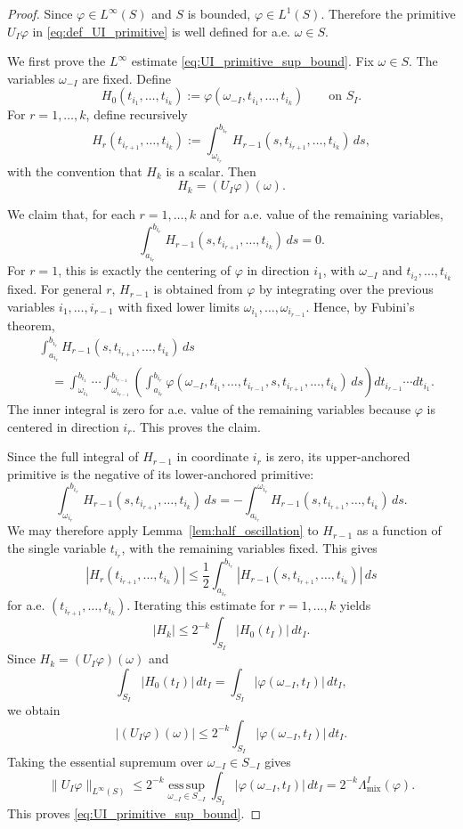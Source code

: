 \documentclass[11pt,letterpaper]{article}
\theoremstyle{definition}
\theoremstyle{remark}
\begin{document}
\begin{proof}
Since $\varphi\in L^\infty(S)$ and $S$ is bounded, $\varphi\in L^1(S)$.
Therefore the primitive $U_I\varphi$ in \eqref{eq:def_UI_primitive} is well
defined for a.e. $\omega\in S$.

We first prove the $L^\infty$ estimate
\eqref{eq:UI_primitive_sup_bound}. Fix $\omega\in S$. The variables
$\omega_{-I}$ are fixed. Define
$$
H_0(t_{i_1},\ldots,t_{i_k})
:=
\varphi(\omega_{-I},t_{i_1},\ldots,t_{i_k})
\qquad\text{on }S_I.
$$
For $r=1,\ldots,k$, define recursively
$$
H_r(t_{i_{r+1}},\ldots,t_{i_k})
:=
\int_{\omega_{i_r}}^{b_{i_r}}
H_{r-1}(s,t_{i_{r+1}},\ldots,t_{i_k})\,ds,
$$
with the convention that $H_k$ is a scalar. Then
$$
H_k=(U_I\varphi)(\omega).
$$

We claim that, for each $r=1,\ldots,k$ and for a.e. value of the remaining
variables,
$$
\int_{a_{i_r}}^{b_{i_r}}
H_{r-1}(s,t_{i_{r+1}},\ldots,t_{i_k})\,ds=0.
$$
For $r=1$, this is exactly the centering of $\varphi$ in direction $i_1$, with
$\omega_{-I}$ and $t_{i_2},\ldots,t_{i_k}$ fixed. For general $r$,
$H_{r-1}$ is obtained from $\varphi$ by integrating over the previous
variables $i_1,\ldots,i_{r-1}$ with fixed lower limits
$\omega_{i_1},\ldots,\omega_{i_{r-1}}$. Hence, by Fubini's theorem,
$$
\begin{aligned}
&\int_{a_{i_r}}^{b_{i_r}}
H_{r-1}(s,t_{i_{r+1}},\ldots,t_{i_k})\,ds
\\
&\quad =
\int_{\omega_{i_1}}^{b_{i_1}}
\cdots
\int_{\omega_{i_{r-1}}}^{b_{i_{r-1}}}
\left(
\int_{a_{i_r}}^{b_{i_r}}
\varphi(\omega_{-I},t_{i_1},\ldots,t_{i_{r-1}},s,
t_{i_{r+1}},\ldots,t_{i_k})\,ds
\right)
dt_{i_{r-1}}\cdots dt_{i_1}.
\end{aligned}
$$
The inner integral is zero for a.e. value of the remaining variables because
$\varphi$ is centered in direction $i_r$. This proves the claim.

Since the full integral of $H_{r-1}$ in coordinate $i_r$ is zero, its
upper-anchored primitive is the negative of its lower-anchored primitive:
$$
\int_{\omega_{i_r}}^{b_{i_r}}
H_{r-1}(s,t_{i_{r+1}},\ldots,t_{i_k})\,ds
=
-
\int_{a_{i_r}}^{\omega_{i_r}}
H_{r-1}(s,t_{i_{r+1}},\ldots,t_{i_k})\,ds.
$$
We may therefore apply Lemma~\ref{lem:half_oscillation} to
$H_{r-1}$ as a function of the single variable $t_{i_r}$, with the remaining
variables fixed. This gives
$$
|H_r(t_{i_{r+1}},\ldots,t_{i_k})|
\le
\frac12
\int_{a_{i_r}}^{b_{i_r}}
|H_{r-1}(s,t_{i_{r+1}},\ldots,t_{i_k})|\,ds
$$
for a.e. $(t_{i_{r+1}},\ldots,t_{i_k})$. Iterating this estimate for
$r=1,\ldots,k$ yields
$$
|H_k|
\le
2^{-k}
\int_{S_I}|H_0(t_I)|\,dt_I.
$$
Since $H_k=(U_I\varphi)(\omega)$ and
$$
\int_{S_I}|H_0(t_I)|\,dt_I
=
\int_{S_I}|\varphi(\omega_{-I},t_I)|\,dt_I,
$$
we obtain
$$
|(U_I\varphi)(\omega)|
\le
2^{-k}
\int_{S_I}|\varphi(\omega_{-I},t_I)|\,dt_I.
$$
Taking the essential supremum over $\omega_{-I}\in S_{-I}$ gives
$$
\|U_I\varphi\|_{L^\infty(S)}
\le
2^{-k}
\operatorname*{ess\,sup}_{\omega_{-I}\in S_{-I}}
\int_{S_I}|\varphi(\omega_{-I},t_I)|\,dt_I
=
2^{-k}\Lambda_{\mathrm{mix}}^I(\varphi).
$$
This proves \eqref{eq:UI_primitive_sup_bound}.


\end{proof}
\end{document}

